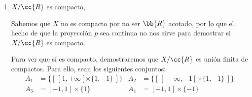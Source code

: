 \documentclass[12pt]{article}
\newcommand{\T}[0]{\cc{T}}
\begin{document}
\begin{ejercicio}[2.5 puntos]
\begin{enumerate}
            Sea $x=\{1\}\times \{1\}=(1,1) \in X/\cc{R}$. Buscamos $U\in \T_X$ saturado
            tal que $\{x\}\in p(U)$. Como $p^{-1}(\{x\}) = x$, buscamos $U\in \T_X$ saturado tal que $x\in U$,
            por lo que $U$ es entorno de $x$, y entonces $\exists \veps\in \bb{R}^+$ tal que
            $B((1,1),\veps)\cap X \subset U$. Por tanto, se tiene que $U\cap \left(]1, +\infty[ \times \{1,-1\}\right) \neq \emptyset$.
            Por tanto, como $U$ es saturado,
            \begin{equation*}
              \left(]1, +\infty[ \times \{1,-1\}\right) \cup \left(1,1\right) \subset U
            \end{equation*}
            Por tanto, tenemos que, tomando $x=\left[(1,1)\right]$ e $y=[~]1, +\infty[ \times \{1,-1\}~]$, se tiene que
            $\forall U\in \T/\cc{R}$ con $x\in U$:
            $$\{y\} \cap U \subset \{y\} \cap \left[~\left(]1, +\infty[ \times \{1,-1\}\right) \cup \left(1,1\right)~\right]
            = \{y\} \cap \left(\{y\}\cup \{x\} \right) = \{y\} \neq \emptyset$$

            Por tanto, no es T2.\\

            Otra opción de ver que no es T2 es ver que tampoco es T1. Para esto, sabemos que
            $\{[~]1, +\infty[ \times \{1,-1\}~]\}$ no es cerrado en $X/\cc{R}$, ya que:
            $$p^{-1}\left(\{[~]1, +\infty[ \times \{1,-1\}~]\}\right) = ]1, +\infty[ \times \{1,-1\} \notin C_{\T_X}$$
            Por tanto, $X/\cc{R}$ no es T1, por lo que tampoco es T2.

            \item $X/\cc{R}$ es compacto,
            
            Sabemos que $X$ no es compacto por no ser $\bb{R}$ acotado, por lo que el hecho de que la proyección
            $p$ sea continua no nos sirve para demostrar si $X/\cc{R}$ es compacto.

            Para ver que sí es compacto, demostraremos que $X/\cc{R}$ es unión finita de compactos.
            Para ello, sean los siguientes conjuntos:
            \begin{align*}
              A_1 &= \{[~]1, +\infty[ \times \{1,-1\}~]\}&
              A_2 &= \{[~]-\infty, -1[ \times \{1,-1\}~]\}
              \\
              A_3 &= [-1,1] \times \{1\}&
              A_4 &= [-1,1] \times \{-1\}
            \end{align*}


\end{enumerate}
\end{ejercicio}
\end{document}
